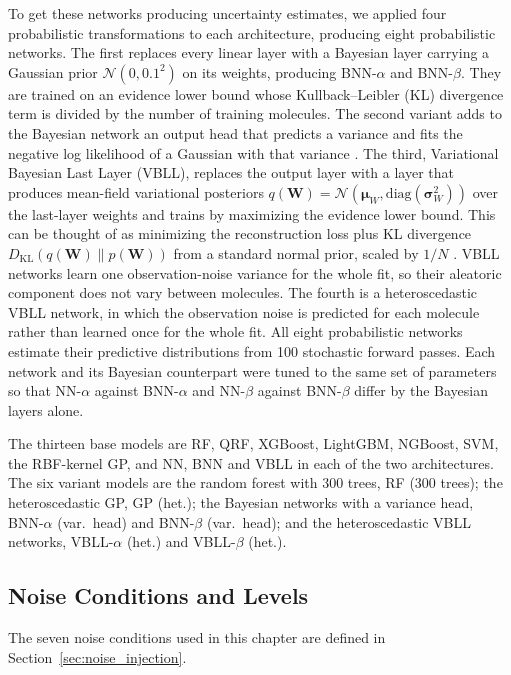To get these networks producing uncertainty estimates, we applied four probabilistic transformations to each architecture, producing eight probabilistic networks. The first replaces every linear layer with a Bayesian layer carrying a Gaussian prior $\mathcal{N}(0, 0.1^2)$ on its weights, producing BNN-$\alpha$ and BNN-$\beta$. They are trained on an evidence lower bound whose  Kullback–Leibler (KL) divergence term is divided by the number of training molecules. The second variant adds to the Bayesian network an output head that predicts a variance and fits the negative log likelihood of a Gaussian with that variance \citep{kendall2017}. The third, Variational Bayesian Last Layer (VBLL), replaces the output layer with a layer that produces mean-field variational posteriors $q(\mathbf{W}) = \mathcal{N}(\boldsymbol{\mu}_W, \text{diag}(\boldsymbol{\sigma}_W^2))$ over the last-layer weights and trains by maximizing the evidence lower bound. This can be thought of as minimizing the reconstruction loss plus KL divergence $D_{\text{KL}}(q(\mathbf{W}) \| p(\mathbf{W}))$ from a standard normal prior, scaled by $1/N$ \citep{Harrison2024}. VBLL networks learn one observation-noise variance for the whole fit, so their aleatoric component does not vary between molecules. The fourth is a heteroscedastic VBLL network, in which the observation noise is predicted for each molecule rather than learned once for the whole fit. All eight probabilistic networks estimate their predictive distributions from 100 stochastic forward passes. Each network and its Bayesian counterpart were tuned to the same set of parameters so that NN-$\alpha$ against BNN-$\alpha$ and NN-$\beta$ against BNN-$\beta$ differ by the Bayesian layers alone.

The thirteen base models are RF, QRF, XGBoost, LightGBM, NGBoost, SVM, the RBF-kernel GP, and NN, BNN and VBLL in each of the two architectures. The six variant models are the random forest with 300 trees, RF (300 trees); the heteroscedastic GP, GP (het.); the Bayesian networks with a variance head, BNN-$\alpha$ (var.\ head) and BNN-$\beta$ (var.\ head); and the heteroscedastic VBLL networks, VBLL-$\alpha$ (het.) and VBLL-$\beta$ (het.).

\subsection{Noise Conditions and Levels}
The seven noise conditions used in this chapter are defined in Section~\ref{sec:noise_injection}.

